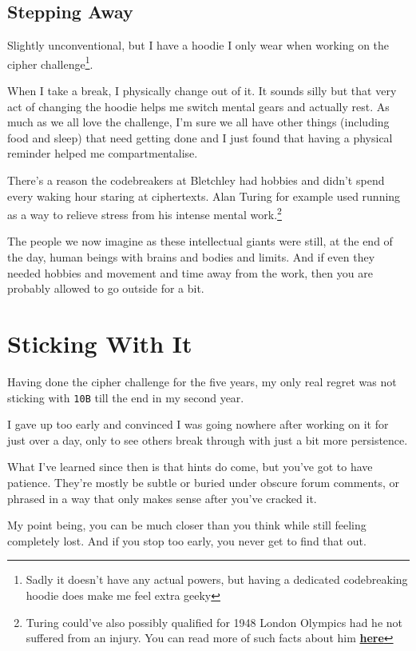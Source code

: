 \subsection{Stepping Away}
Slightly unconventional, but I have a hoodie I only wear when working on the cipher challenge\footnote{Sadly it doesn’t have any actual powers, but having a dedicated codebreaking hoodie does make me feel extra geeky}. 

When I take a break, I physically change out of it. It sounds silly but that very act of changing the hoodie helps me switch mental gears and actually rest. As much as we all love the challenge, I’m sure we all have other things (including food and sleep) that need getting done and I just found that having a physical reminder helped me compartmentalise.  

There’s a reason the codebreakers at Bletchley had hobbies and didn't spend every waking hour staring at ciphertexts. Alan Turing for example used running as a way to relieve stress from his intense mental work.\footnote{Turing could've also possibly qualified for 1948 London Olympics had he not suffered from an injury. You can read more of such facts about him \textbf{\href{https://www.bletchleypark.org.uk/our-story/10-things-to-know-about-alan-turing/}{here}}}

The people we now imagine as these intellectual giants were still, at the end of the day, human beings with brains and bodies and limits. And if even they needed hobbies and movement and time away from the work, then you are probably allowed to go outside for a bit.


\section{Sticking With It}

Having done the cipher challenge for the five years, my only real regret was not sticking with \texttt{10B} till the end in my second year. 

I gave up too early and convinced I was going nowhere after working on it for just over a day, only to see others break through with just a bit more persistence. 

What I’ve learned since then is that hints do come, but you’ve got to have patience. They’re mostly be subtle or buried under obscure forum comments, or phrased in a way that only makes sense after you’ve cracked it. 

My point being, you can be much closer than you think while still feeling completely lost. And if you stop too early, you never get to find that out.

